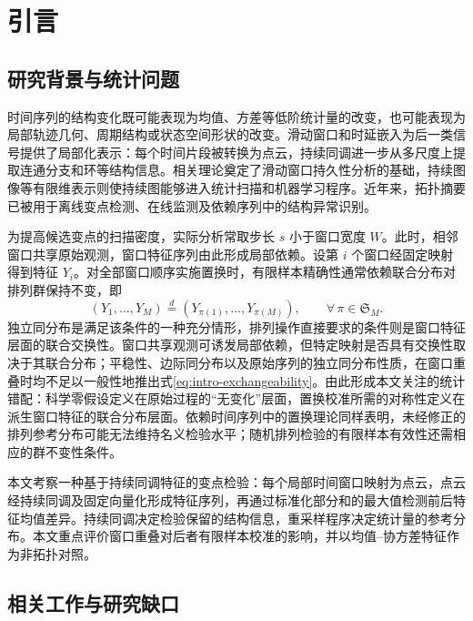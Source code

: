 \section{引言}\label{sec:intro}

\subsection{研究背景与统计问题}\label{sec:intro-bg}

时间序列的结构变化既可能表现为均值、方差等低阶统计量的改变，也可能表现为局部轨迹几何、周期结构或状态空间形状的改变。滑动窗口和时延嵌入为后一类信号提供了局部化表示：每个时间片段被转换为点云，持续同调进一步从多尺度上提取连通分支和环等结构信息。相关理论奠定了滑动窗口持久性分析的基础\cite{PereaHarer2015}，持续图像等有限维表示则使持续图能够进入统计扫描和机器学习程序\cite{Adams2017}。近年来，拓扑摘要已被用于离线变点检测、在线监测及依赖序列中的结构异常识别\cite{IslambekovYuvarajGel2020,ZhengMakXieXie2023,ChazalLevrardRoyer2024,NieYue2026}。

为提高候选变点的扫描密度，实际分析常取步长 $s$ 小于窗口宽度 $W$。此时，相邻窗口共享原始观测，窗口特征序列由此形成局部依赖。设第 $i$ 个窗口经固定映射得到特征 $Y_i$。对全部窗口顺序实施置换时，有限样本精确性通常依赖联合分布对排列群保持不变，即
\begin{equation}\label{eq:intro-exchangeability}
 (Y_1,\ldots,Y_M)\overset{d}{=}(Y_{\pi(1)},\ldots,Y_{\pi(M)}),
 \qquad \forall\,\pi\in\mathfrak S_M.
\end{equation}
独立同分布是满足该条件的一种充分情形，排列操作直接要求的条件则是窗口特征层面的联合交换性。窗口共享观测可诱发局部依赖，但特定映射是否具有交换性取决于其联合分布；平稳性、边际同分布以及原始序列的独立同分布性质，在窗口重叠时均不足以一般性地推出式\eqref{eq:intro-exchangeability}。由此形成本文关注的统计错配：科学零假设定义在原始过程的“无变化”层面，置换校准所需的对称性定义在派生窗口特征的联合分布层面。依赖时间序列中的置换理论同样表明，未经修正的排列参考分布可能无法维持名义检验水平\cite{RomanoTirlea2022}；随机排列检验的有限样本有效性还需相应的群不变性条件\cite{HemerikGoeman2018}。

本文考察一种基于持续同调特征的变点检验：每个局部时间窗口映射为点云，点云经持续同调及固定向量化形成特征序列，再通过标准化部分和的最大值检测前后特征均值差异。持续同调决定检验保留的结构信息，重采样程序决定统计量的参考分布。本文重点评价窗口重叠对后者有限样本校准的影响，并以均值--协方差特征作为非拓扑对照。

\subsection{相关工作与研究缺口}\label{sec:intro-lit}

